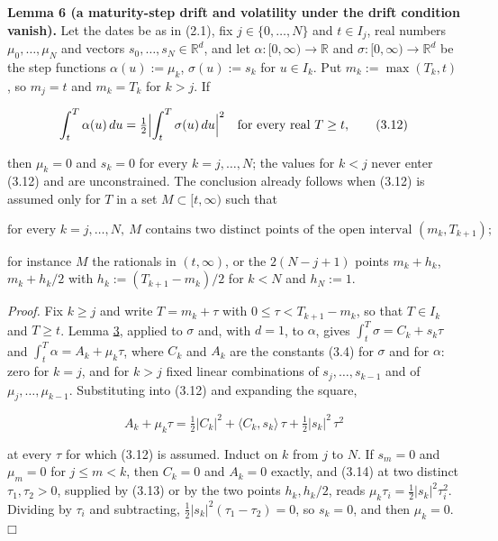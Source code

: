\documentclass[11pt]{article}
\providecommand{\square}{\mdlgwhtsquare}
\begin{document}
\label{res:Lemma-6}
\textbf{Lemma 6 (a maturity-step drift and volatility under the drift condition vanish).} Let the dates be as in (2.1), fix \(j \in \{0, \dots, N\}\) and \(t \in I_j\), real numbers \(\mu_0, \dots, \mu_N\) and vectors \(s_0, \dots, s_N \in \mathbb R^d\), and let \(\alpha : [0, \infty) \to \mathbb R\) and \(\sigma : [0, \infty) \to \mathbb R^d\) be the step functions \(\alpha(u) := \mu_k\), \(\sigma(u) := s_k\) for \(u \in I_k\). Put \(m_k := \max(T_k, t)\), so \(m_j = t\) and \(m_k = T_k\) for \(k > j\). If

\begin{equation*}
\int_t^T \alpha(u)\,du = \tfrac12 \Bigl| \int_t^T \sigma(u)\,du \Bigr|^2 \quad \text{for every real } T \ge t, \tag{3.12}\label{eq:3.12}
\end{equation*}

then \(\mu_k = 0\) and \(s_k = 0\) for every \(k = j, \dots, N\); the values for \(k < j\) never enter (3.12) and are unconstrained. The conclusion already follows when (3.12) is assumed only for \(T\) in a set \(M \subset [t, \infty)\) such that

\begin{equation*}
\text{for every } k = j, \dots, N,\ M \text{ contains two distinct points of the open interval } (m_k, T_{k+1}); \tag{3.13}\label{eq:3.13}
\end{equation*}

for instance \(M\) the rationals in \((t, \infty)\), or the \(2(N - j + 1)\) points \(m_k + h_k\), \(m_k + h_k / 2\) with \(h_k := (T_{k+1} - m_k)/2\) for \(k < N\) and \(h_N := 1\).

\emph{Proof.} Fix \(k \ge j\) and write \(T = m_k + \tau\) with \(0 \le \tau < T_{k+1} - m_k\), so that \(T \in I_k\) and \(T \ge t\). Lemma \hyperref[res:Lemma-3]{3}, applied to \(\sigma\) and, with \(d = 1\), to \(\alpha\), gives \(\int_t^T \sigma = C_k + s_k \tau\) and \(\int_t^T \alpha = A_k + \mu_k \tau\), where \(C_k\) and \(A_k\) are the constants (3.4) for \(\sigma\) and for \(\alpha\): zero for \(k = j\), and for \(k > j\) fixed linear combinations of \(s_j, \dots, s_{k-1}\) and of \(\mu_j, \dots, \mu_{k-1}\). Substituting into (3.12) and expanding the square,

\begin{equation*}
A_k + \mu_k \tau = \tfrac12 |C_k|^2 + \langle C_k, s_k \rangle\, \tau + \tfrac12 |s_k|^2\, \tau^2 \tag{3.14}\label{eq:3.14}
\end{equation*}

at every \(\tau\) for which (3.12) is assumed. Induct on \(k\) from \(j\) to \(N\). If \(s_m = 0\) and \(\mu_m = 0\) for \(j \le m < k\), then \(C_k = 0\) and \(A_k = 0\) exactly, and (3.14) at two distinct \(\tau_1, \tau_2 > 0\), supplied by (3.13) or by the two points \(h_k, h_k/2\), reads \(\mu_k \tau_i = \tfrac12 |s_k|^2 \tau_i^2\). Dividing by \(\tau_i\) and subtracting, \(\tfrac12 |s_k|^2 (\tau_1 - \tau_2) = 0\), so \(s_k = 0\), and then \(\mu_k = 0\).\hfill$\square$
\end{document}
